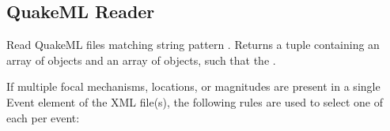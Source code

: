 \documentclass[letterpaper,11pt,english]{sphinxmanual}
\begin{document}
\subsection{QuakeML Reader}
\label{\detokenize{src/Submodules/quake:quakeml-reader}}

\begin{fulllineitems}
\label{\detokenize{src/Submodules/quake:read_qml}}
\end{fulllineitems}


Read QuakeML files matching string pattern . Returns a tuple containing
an array of  objects and an array of  objects, such that the
.

If multiple focal mechanisms, locations, or magnitudes are present in a single
Event element of the XML file(s), the following rules are used to select one of
each per event:
\end{document}
